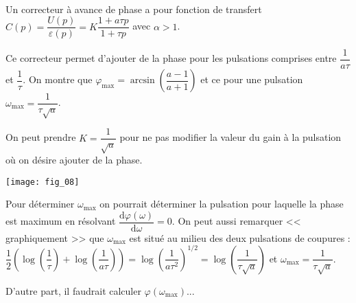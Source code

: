 \noindent\begin{minipage}[c]{.49\linewidth}
\begin{defi} ~\\

Un correcteur à avance de phase a pour fonction de transfert $C(p)=\dfrac{U(p)}{\varepsilon(p)}=K\dfrac{1+a\tau p}{1+\tau p}$ avec $\alpha>1$.

\end{defi}
\begin{resultat}
Ce correcteur permet d'ajouter de la phase pour les pulsations comprises entre $\dfrac{1}{a\tau}$ et $\dfrac{1}{\tau}$. On montre que $\varphi_{\text{max}} = \arcsin \left( \dfrac{a-1}{a+1}\right)$ et ce pour une pulsation $\omega_{\text{max}}=\dfrac{1}{\tau\sqrt{a}}$.
\end{resultat}

\begin{rem}
On peut prendre $K=\dfrac{1}{\sqrt{a}}$ pour ne pas modifier la valeur du gain à la pulsation où on désire ajouter de la phase. 
\end{rem}

\end{minipage} \hfill
\begin{minipage}[c]{.49\linewidth}
\begin{center}
\texttt{[image: fig\_08]}
\end{center}

\end{minipage}

\vspace{.25cm}

\begin{demo}
Pour déterminer $\omega_{\max}$ on pourrait déterminer la pulsation pour laquelle la phase est maximum en résolvant $\dfrac{\text{d}\varphi\left(\omega \right)}{\text{d}\omega}=0$. 
On peut aussi remarquer << graphiquement >> que $\omega_{\text{max}}$ est situé au milieu des deux pulsations de coupures : $\dfrac{1}{2}\left(\log \left(\dfrac{1}{\tau}\right)+\log \left(\dfrac{1}{a\tau}\right)\right)=\log \left(\dfrac{1}{a\tau^2}\right)^{1/2}=\log \left(\dfrac{1}{\tau\sqrt{a}}\right)$ et $\omega_{\text{max}}=\dfrac{1}{\tau\sqrt{a}}$.

D'autre part, il faudrait calculer 
$\varphi\left(\omega_{\text{max}}\right)$...
%
%
%
%
%

\end{demo}


